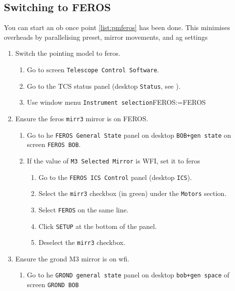 \documentclass[11pt,fleqn,a4paper]{book}
\makeatletter
\def\menu#1#2{\texttt{#1}\ifx{}#2\else\@for\@x:=#2\do{$\rightarrow$\texttt{\@x}}\fi}
\def\wmenu#1#2{window menu \menu{#1}{#2}}
\makeatother
\begin{document}
\subsection{Switching to FEROS}
\label{sec:switchingFeros}

You can start an \gls{ob} once point \ref{list:pmferos} has been done.  This minimises
overheads by parallelising \gls{preset}, mirror movements, and \gls{ag} settings

\label{proc:switchferos}
\begin{enumerate}
  \item Switch the \gls{pointing model} to \gls{feros}.
  \begin{enumerate}
    \item Go to screen \texttt{Telescope Control Software}.
    \item Go to the \gls{TCS status panel} (\gls{desktop} \texttt{Status}, see ). 
    \item Use \wmenu{Instrument selection}{FEROS}
  \end{enumerate}
  \item Ensure the \gls{feros} \texttt{\gls{mirr3}} mirror is on FEROS.\label{list:pmferos}
  \begin{enumerate}
    \item Go to he \texttt{FEROS \gls{General State}} panel on \gls{desktop} \texttt{BOB+gen state} on screen \texttt{FEROS BOB}.
    \item If the value of \texttt{M3 Selected Mirror} is WFI, set it to \gls{feros}
    \begin{enumerate}
      \item Go to the \texttt{FEROS \gls{ICS Control}} panel (\gls{desktop} \texttt{ICS}).
      \item Select the \texttt{\gls{mirr3}} checkbox (in green) under the \texttt{Motors} section.
      \item Select \texttt{FEROS} on the same line.
      \item Click \texttt{SETUP} at the bottom of the panel.
      \item Deselect the \texttt{\gls{mirr3}} checkbox.
    \end{enumerate}   
  \end{enumerate}
  \item Ensure the \gls{grond} \gls{M3} mirror is on \gls{wfi}.
  \begin{enumerate}
    \item Go to he \texttt{GROND general state} panel on \gls{desktop} \texttt{bob+gen space} of screen \texttt{GROND BOB}

\end{enumerate}
\end{enumerate}
\end{document}

